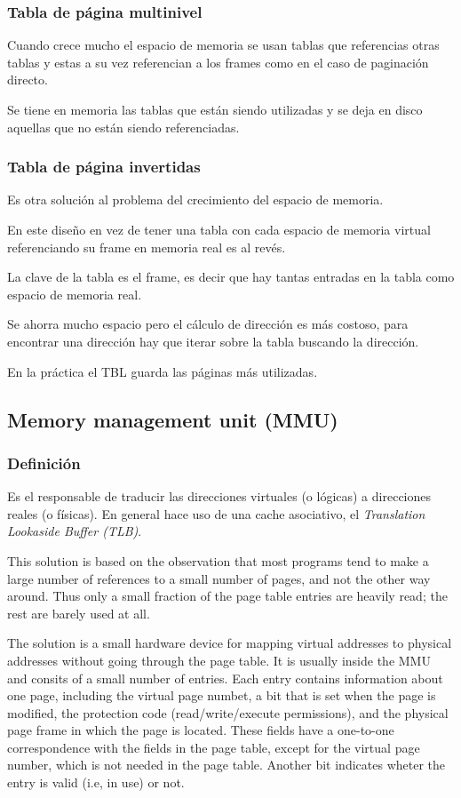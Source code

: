 \documentclass[a4paper, twoside]{article}
\begin{document}
\subsubsection{Tabla de página multinivel}
Cuando crece mucho el espacio de memoria se usan tablas que referencias otras tablas y estas a su vez referencian a los frames como en el caso de paginación directo.

Se tiene en memoria las tablas que están siendo utilizadas y se deja en disco aquellas que no están siendo referenciadas.

\subsubsection{Tabla de página invertidas}
Es otra solución al problema del crecimiento del espacio de memoria.

En este diseño en vez de tener una tabla con cada espacio de memoria virtual referenciando su frame en memoria real es al revés.

La clave de la tabla es el frame, es decir que hay tantas entradas en la tabla como espacio de memoria real.

Se ahorra mucho espacio pero el cálculo de dirección es más costoso, para encontrar una dirección hay que iterar sobre la tabla buscando la dirección.

En la práctica el TBL guarda las páginas más utilizadas.

\subsection{Memory management unit (MMU)}
\subsubsection{Definición}
Es el responsable de traducir las direcciones virtuales (o lógicas) a direcciones reales (o físicas).
En general hace uso de una cache asociativo, el \emph{Translation Lookaside Buffer (TLB)}.

This solution is based on the observation that most programs tend to make a large number of references to a small number of pages, and not the other way around. Thus only a small fraction of the page table entries are heavily read; the rest are barely used at all.

The solution is a small hardware device for mapping virtual addresses to physical addresses without going through the page table. It is usually inside the MMU and consits of a small number of entries. Each entry contains information about one page, including the virtual page numbet, a bit that is set when the page is modified, the protection code (read/write/execute permissions), and the physical page frame in which the page is located. These fields have a one-to-one correspondence with the fields in the page table, except for the virtual page number, which is not needed in the page table. Another bit indicates wheter the entry is valid (i.e, in use) or not.
\end{document}
